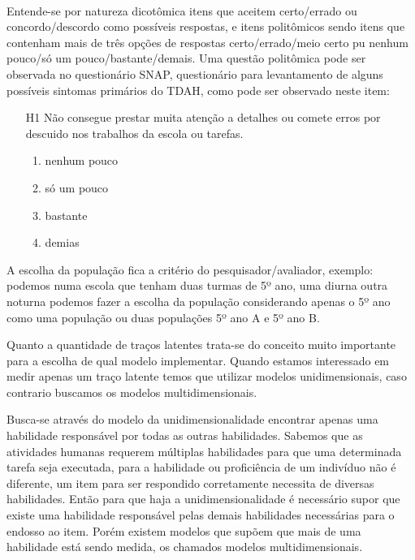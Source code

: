     \paragraph{}
    	Entende-se por natureza dicotômica itens que aceitem certo/errado ou concordo/descordo como possíveis respostas, e itens politômicos sendo itens que contenham mais de três opções de respostas certo/errado/meio certo pu nenhum pouco/só um pouco/bastante/demais. Uma questão politômica pode ser observada no questionário  SNAP, questionário  para levantamento de alguns  possíveis  sintomas  primários  do  TDAH, como pode ser observado neste item:
    \newpage
	\begin{enumerate}
	    \item[H1] Não consegue prestar muita atenção a detalhes ou comete erros por descuido nos trabalhos da escola ou tarefas.
	    \begin{enumerate}
	        \item nenhum pouco
	        \item só um pouco
	        \item bastante
	        \item demias
	    \end{enumerate}
	\end{enumerate}
\par
	    A escolha da população fica a critério do pesquisador/avaliador, exemplo: podemos numa escola que tenham duas turmas de 5º ano, uma diurna outra noturna podemos fazer a escolha da população considerando apenas o 5º ano como uma população ou duas populações 5º ano A e 5º ano B. %
	 \par
	 	Quanto a quantidade de traços latentes trata-se do conceito muito importante para a escolha de qual modelo implementar. Quando estamos interessado em medir apenas um traço latente temos que utilizar modelos unidimensionais, caso contrario buscamos os modelos multidimensionais.
	 \par 
	    Busca-se através do modelo da unidimensionalidade encontrar apenas uma habilidade responsável por todas as outras habilidades. Sabemos que as atividades humanas requerem múltiplas habilidades para que uma determinada tarefa seja executada,  para a habilidade ou proficiência de um indivíduo não é diferente, um item para ser respondido corretamente necessita de diversas habilidades. Então para que haja a unidimensionalidade é necessário supor que existe uma habilidade responsável pelas demais habilidades necessárias para o endosso ao item. Porém existem modelos que supõem que mais de uma habilidade está sendo medida, os chamados modelos multidimensionais.

